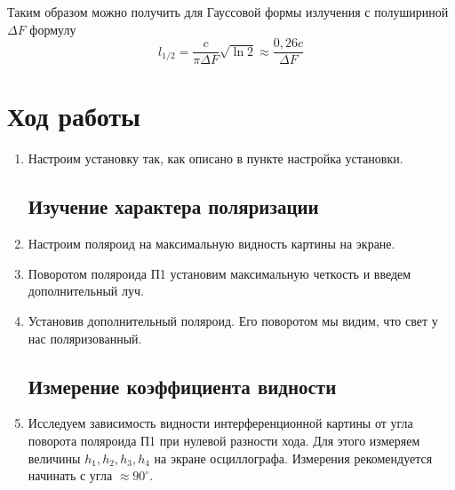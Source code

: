 \documentclass[a4paper, 12pt]{article}%
\begin{document}
Таким образом можно получить для Гауссовой формы излучения с полушириной $\Delta F$ формулу 
\begin{equation}
l_{1/2} = \frac{c}{\pi \Delta F} \sqrt{ \ln 2} \approx \frac{0,26 c}{\Delta F}
\end{equation}
\section*{Ход работы}
\begin{enumerate}
\subsection*{Настройка}
\item Настроим установку так, как описано в пункте настройка установки.
\subsection*{Изучение характера поляризации}
\item Настроим поляроид на максимальную видность картины на экране.
\item Поворотом поляроида П1 установим максимальную четкость и введем дополнительный луч.
\item Установив дополнительный поляроид. Его поворотом мы видим, что свет у нас поляризованный. 
\subsection*{Измерение коэффициента видности}
\item Исследуем зависимость видности интерференционной картины от угла поворота поляроида П1 при нулевой разности хода. Для этого измеряем величины $h_1, h_2, h_3, h_4$ на экране осциллографа. Измерения рекомендуется начинать с угла $\approx 90^{\circ}$.


\end{enumerate}
\end{document}
